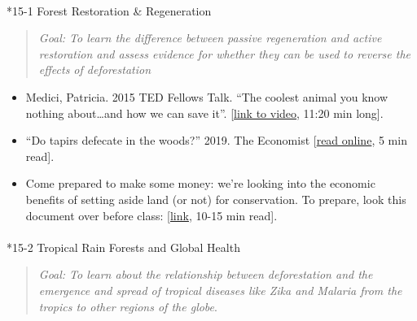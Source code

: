 \documentclass[
  10pt,
  letterpaper,
  oneside,
  open=any]{scrbook}
\makeatletter
\let\oldparagraph\paragraph
\renewcommand{\paragraph}{
    \@ifstar
      \xxxParagraphStar
      \xxxParagraphNoStar
  }
\newcommand{\xxxParagraphStar}[1]{\oldparagraph*{#1}\mbox{}}
\newcommand{\xxxParagraphNoStar}[1]{\oldparagraph{#1}\mbox{}}
\makeatother
\begin{document}

\paragraph*{15-1 Forest Restoration \&
Regeneration}\label{forest-restoration-regeneration}

\begin{quote}
\emph{Goal: To learn the difference between passive regeneration and
active restoration and assess evidence for whether they can be used to
reverse the effects of deforestation}
\end{quote}

\begin{itemize}
\item
  Medici, Patricia. 2015 TED Fellows Talk. ``The coolest animal you know
  nothing about\ldots and how we can save it''.
  {[}\href{https://www.ted.com/talks/patricia_medici_the_coolest_animal_you_know_nothing_about_and_how_we_can_save_it\#t-694653}{link
  to video}, 11:20 min long{]}.
\item
  ``Do tapirs defecate in the woods?'' 2019. The Economist
  {[}\href{https://www.economist.com/science-and-technology/2019/04/17/do-tapirs-defecate-in-the-woods}{read
  online}, 5 min read{]}.
\item
  Come prepared to make some money: we're looking into the economic
  benefits of setting aside land (or not) for conservation. To prepare,
  look this document over before class:
  {[}\href{https://www.tandfonline.com/doi/full/10.1080/00220485.2016.1146098}{link},
  10-15 min read{]}.
\end{itemize}

\paragraph*{15-2 Tropical Rain Forests and Global
Health}\label{tropical-rain-forests-and-global-health}

\begin{quote}
\emph{Goal: To learn about the relationship between deforestation and
the emergence and spread of tropical diseases like Zika and Malaria from
the tropics to other regions of the globe}.
\end{quote}
\end{document}
